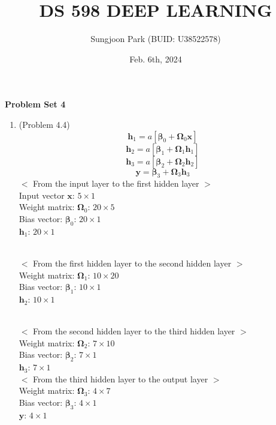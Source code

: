 \documentclass[10pt]{article}
\title{DS 598 DEEP LEARNING}
\author{Sungjoon Park (BUID: U38522578)}
\date{Feb. 6th, 2024}
\begin{document}
\maketitle

\setlength{\parindent}{0cm}
\setlength{\parskip}{2mm}

\textbf{Problem Set 4}

\begin{enumerate}

\item (Problem 4.4) \\
	$$\boldsymbol{h}_1=a[\boldsymbol{\beta}_0+\boldsymbol{\Omega}_0 \boldsymbol{x}]$$
	$$\boldsymbol{h}_2=a[\boldsymbol{\beta}_1+\boldsymbol{\Omega}_1\boldsymbol{h}_1]$$
	$$\boldsymbol{h}_3=a[\boldsymbol{\beta}_2+\boldsymbol{\Omega}_2\boldsymbol{h}_2]$$
	$$\boldsymbol{y}=\boldsymbol{\beta}_3+\boldsymbol{\Omega}_3\boldsymbol{h}_3$$
	$<$ From the input layer to the first hidden layer $>$ \\
	Input vector $\boldsymbol{x}$: $5 \times 1$ \\
	Weight matrix: $\boldsymbol{\Omega}_0$: $20 \times 5$ \\
	Bias vector: $\boldsymbol{\beta}_0$: $20 \times 1$ \\
	$\boldsymbol{h}_1$: $20 \times 1$ \\
	
	\
	
	$<$ From the first hidden layer to the second hidden layer $>$ \\
	Weight matrix: $\boldsymbol{\Omega}_1$: $10 \times 20$ \\
	Bias vector: $\boldsymbol{\beta}_1$: $10 \times 1$ \\
	$\boldsymbol{h}_2$: $10 \times 1$ \\
	
	\
	
	$<$ From the second hidden layer to the third hidden layer $>$ \\
	Weight matrix: $\boldsymbol{\Omega}_2$: $7 \times 10$ \\
	Bias vector: $\boldsymbol{\beta}_2$: $7 \times 1$ \\
	$\boldsymbol{h}_3$: $7 \times 1$ \\
	
	$<$ From the third hidden layer to the output layer $>$ \\
	Weight matrix: $\boldsymbol{\Omega}_3$: $4 \times 7$ \\
	Bias vector: $\boldsymbol{\beta}_3$: $4 \times 1$ \\
	$\boldsymbol{y}$: $4 \times 1$ \\
	

\end{enumerate}
\end{document}
